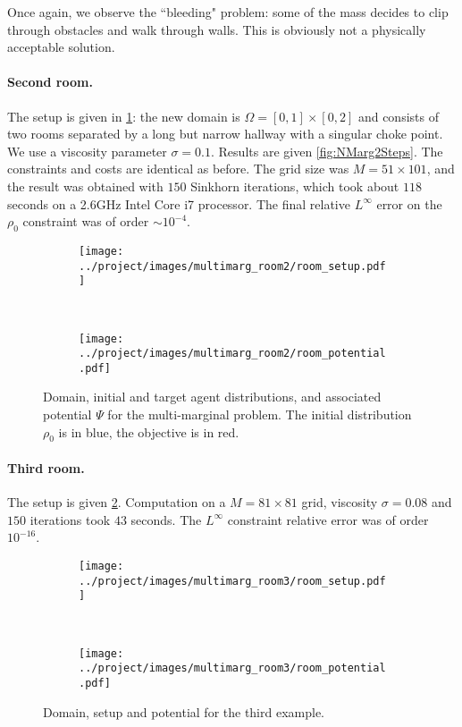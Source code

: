 \documentclass[../report.tex]{subfiles}
\begin{document}
Once again, we observe the ``bleeding" problem: some of the mass decides to clip through obstacles and walk through walls. This is obviously not a physically acceptable solution.


\paragraph{Second room.} The setup is given in \cref{fig:NMarg2DomainPot}: the new domain is $\Omega = [0,1] \times [0,2]$ and consists of two rooms separated by a long but narrow hallway with a singular choke point. We use a viscosity parameter $\sigma = 0.1$. Results are given \cref{fig:NMarg2Steps}. The constraints and costs are identical as before. The grid size was $M = 51 \times 101$, and the result was obtained with $150$ Sinkhorn iterations, which took about $118$ seconds on a 2.6GHz Intel Core i7 processor. The final relative $L^\infty$ error on the $\rho_0$ constraint was of order $\sim 10^{-4}$.


\begin{figure}[h]
	\centering
	\begin{subfigure}[b]{.3\linewidth}
	\texttt{[image: ../project/images/multimarg\_room2/room\_setup.pdf]}
	\end{subfigure}~
	\begin{subfigure}[b]{.39\linewidth}
	\texttt{[image: ../project/images/multimarg\_room2/room\_potential.pdf]}
	\end{subfigure}
	\caption{Domain, initial and target agent distributions, and associated potential $\Psi$ for the multi-marginal problem. The initial distribution $\rho_0$ is in blue, the objective is in red.}\label{fig:NMarg2DomainPot}
\end{figure}



\paragraph{Third room.} The setup is given \cref{fig:Room3}. Computation on a $M=81\times 81$ grid, viscosity $\sigma=0.08$ and $150$ iterations took $43$ seconds. The $L^\infty$ constraint relative error was of order $10^{-16}$.

\begin{figure}[h]
	\centering
	\begin{subfigure}[c]{.3\linewidth}
	\texttt{[image: ../project/images/multimarg\_room3/room\_setup.pdf]}	
	\end{subfigure}~
	\begin{subfigure}[c]{.4\linewidth}
	\texttt{[image: ../project/images/multimarg\_room3/room\_potential.pdf]}	
	\end{subfigure}
	\caption{Domain, setup and potential for the third example.}\label{fig:Room3}
\end{figure}
\end{document}
